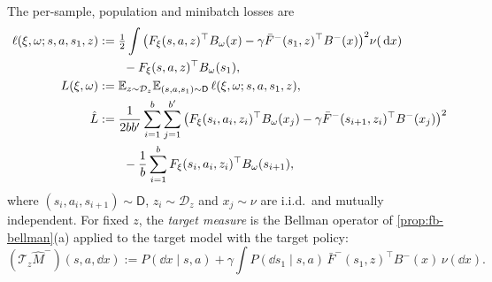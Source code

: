 The per-sample, population and minibatch losses are
\begin{align}
\ell(\xi,\omega;s,a,s_1,z)&:=\tfrac12\int\big(F_\xi(s,a,z)^\top B_\omega(x)-\gamma\bar F^-(s_1,z)^\top B^-(x)\big)^2\nu(\,\mathrm{d} x)\notag\\
&\qquad-F_\xi(s,a,z)^\top B_\omega(s_1),\label{eq:fb-loss-sample}\\
L(\xi,\omega)&:=\mathbb{E}_{z\sim\mathcal D_z}\mathbb{E}_{(s,a,s_1)\sim\mathsf D}\,\ell(\xi,\omega;s,a,s_1,z),\label{eq:fb-loss-pop}\\
\hat L&:=\frac1{2bb'}\sum_{i=1}^b\sum_{j=1}^{b'}\big(F_\xi(s_i,a_i,z_i)^\top B_\omega(x_j)-\gamma\bar F^-(s_{i+1},z_i)^\top B^-(x_j)\big)^2\notag\\
&\qquad-\frac1b\sum_{i=1}^bF_\xi(s_i,a_i,z_i)^\top B_\omega(s_{i+1}),\label{eq:fb-loss-batch}
\end{align}
where $(s_i,a_i,s_{i+1})\sim\mathsf D$, $z_i\sim\mathcal D_z$ and $x_j\sim\nu$ are i.i.d.\ and mutually independent.
For fixed $z$, the \emph{target measure} is the Bellman operator of \cref{prop:fb-bellman}(a) applied to the target model with the target policy:
\[
(\mathcal T_z\hat M^-)(s,a,\dd x):=P(\dd x\mid s,a)+\gamma\int P(\dd s_1\mid s,a)\,\bar F^-(s_1,z)^\top B^-(x)\,\nu(\dd x).
\]

